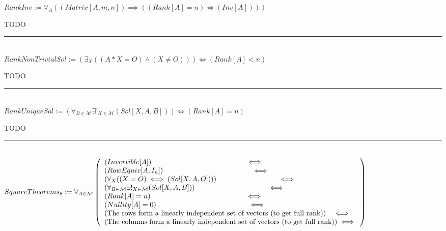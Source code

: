 \documentclass{book}
\newcommand{\abr}{:=}
\begin{document}
$RankInv \abr \forall_{A}((Matrix[A, m, n]) \implies ((Rank[A] = n) \iff (Inv[A])))$
\begin{enumerate}
  \lit TODO
\end{enumerate} \vspace{.75mm} \hrule \vspace{.75mm} \ \\ 

$RankNonTrivialSol \abr (\exists_{X}((A * X = O) \land (X \neq O))) \iff (Rank[A] < n)$
\begin{enumerate}
  \lit TODO
\end{enumerate} \vspace{.75mm} \hrule \vspace{.75mm} \ \\ 

$RankUniqueSol \abr (\forall_{B \in \mathcal{M}} \exists!_{X \in \mathcal{M}}(Sol[X, A, B])) \iff (Rank[A] = n)$
\begin{enumerate}
  \lit TODO
\end{enumerate} \vspace{.75mm} \hrule \vspace{.75mm} \ \\ 

$SquareTheorems_8 \abr \forall_{A \in \mathcal{M}}\left(\begin{array}{ll}
  (Invertible[A]) \hfill \iff \hfill \\
  (RowEquiv[A, I_n]) \hfill \iff \hfill \\
  (\forall_{X}((X = O) \iff (Sol[X, A, O]))) \hfill \iff \hfill \\
  (\forall_{B \in \mathcal{M}} \exists!_{X \in \mathcal{M}}(Sol[X, A, B])) \hfill \iff \hfill \\
  (Rank[A] = n) \hfill \iff \hfill \\
  (Nullity[A] = 0) \hfill \iff \hfill \\
  (\text{The rows form a linearly independent set of vectors (to get full rank)}) \hfill \iff \hfill \\
  (\text{The columns form a linearly independent set of vectors (to get full rank)}) \hfill \iff \hfill \\
\end{array}\right)$ \\
\end{document}
